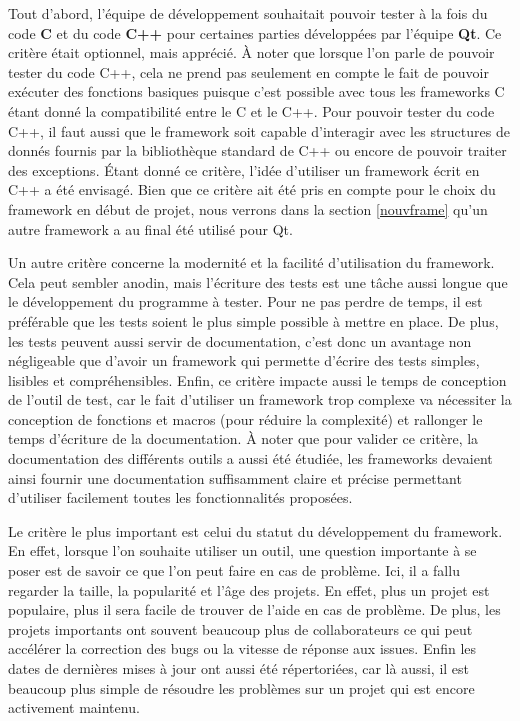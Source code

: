 \documentclass[a4paper]{article}
\begin{document}
Tout d'abord, l'équipe de développement souhaitait pouvoir tester à la fois du
code \textbf{C} et du code \textbf{C++} pour certaines parties développées par
l'équipe \textbf{Qt}. Ce critère était optionnel, mais apprécié. À noter que
lorsque l'on parle de pouvoir tester du code C++, cela ne prend pas seulement en
compte le fait de pouvoir exécuter des fonctions basiques puisque c'est possible
avec tous les frameworks C étant donné la compatibilité entre le C et le C++.
Pour pouvoir tester du code C++, il faut aussi que le framework soit capable
d'interagir avec les structures de donnés fournis par la bibliothèque standard
de C++ ou encore de pouvoir traiter des exceptions. Étant donné ce critère,
l'idée d'utiliser un framework écrit en C++ a été envisagé. Bien que ce critère
ait été pris en compte pour le choix du framework en début de projet, nous
verrons dans la section \ref{nouvframe} qu'un autre framework a au final été
utilisé pour Qt.

Un autre critère concerne la modernité et la facilité d'utilisation du
framework. Cela peut sembler anodin, mais l'écriture des tests est une tâche
aussi longue que le développement du programme à tester. Pour ne pas perdre de
temps, il est préférable que les tests soient le plus simple possible à mettre
en place. De plus, les tests peuvent aussi servir de documentation, c'est donc
un avantage non négligeable que d'avoir un framework qui permette d'écrire des
tests simples, lisibles et compréhensibles. Enfin, ce critère impacte aussi le
temps de conception de l'outil de test, car le fait d'utiliser un framework trop
complexe va nécessiter la conception de fonctions et macros (pour réduire la
complexité) et rallonger le temps d'écriture de la documentation. À noter que
pour valider ce critère, la documentation des différents outils a aussi été
étudiée, les frameworks devaient ainsi fournir une documentation suffisamment
claire et précise permettant d'utiliser facilement toutes les fonctionnalités
proposées.

Le critère le plus important est celui du statut du développement du framework.
En effet, lorsque l'on souhaite utiliser un outil, une question importante à se
poser est de savoir ce que l'on peut faire en cas de problème. Ici, il a fallu
regarder la taille, la popularité et l'âge des projets. En effet, plus un projet
est populaire, plus il sera facile de trouver de l'aide en cas de problème. De
plus, les projets importants ont souvent beaucoup plus de collaborateurs ce qui
peut accélérer la correction des bugs ou la vitesse de réponse aux issues. Enfin
les dates de dernières mises à jour ont aussi été répertoriées, car là aussi, il
est beaucoup plus simple de résoudre les problèmes sur un projet qui est encore
activement maintenu.
\end{document}
